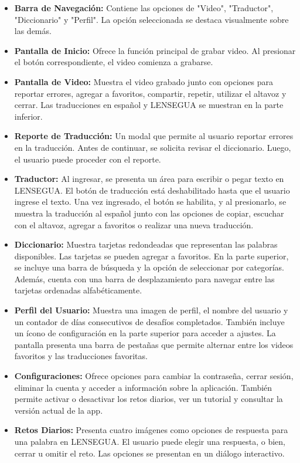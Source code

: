 \begin{itemize}
    \item \textbf{Barra de Navegación:} Contiene las opciones de "Video", "Traductor", "Diccionario" y "Perfil". La opción seleccionada se destaca visualmente sobre las demás.
    
    \item \textbf{Pantalla de Inicio:} Ofrece la función principal de grabar video. Al presionar el botón correspondiente, el video comienza a grabarse.
    
    \item \textbf{Pantalla de Video:} Muestra el video grabado junto con opciones para reportar errores, agregar a favoritos, compartir, repetir, utilizar el altavoz y cerrar. Las traducciones en español y LENSEGUA se muestran en la parte inferior.
    
    \item \textbf{Reporte de Traducción:} Un modal que permite al usuario reportar errores en la traducción. Antes de continuar, se solicita revisar el diccionario. Luego, el usuario puede proceder con el reporte.
    
    \item \textbf{Traductor:} Al ingresar, se presenta un área para escribir o pegar texto en LENSEGUA. El botón de traducción está deshabilitado hasta que el usuario ingrese el texto. Una vez ingresado, el botón se habilita, y al presionarlo, se muestra la traducción al español junto con las opciones de copiar, escuchar con el altavoz, agregar a favoritos o realizar una nueva traducción.
    
    \item \textbf{Diccionario:} Muestra tarjetas redondeadas que representan las palabras disponibles. Las tarjetas se pueden agregar a favoritos. En la parte superior, se incluye una barra de búsqueda y la opción de seleccionar por categorías. Además, cuenta con una barra de desplazamiento para navegar entre las tarjetas ordenadas alfabéticamente.
    
    \item \textbf{Perfil del Usuario:} Muestra una imagen de perfil, el nombre del usuario y un contador de días consecutivos de desafíos completados. También incluye un ícono de configuración en la parte superior para acceder a ajustes. La pantalla presenta una barra de pestañas que permite alternar entre los videos favoritos y las traducciones favoritas.
    
    \item \textbf{Configuraciones:} Ofrece opciones para cambiar la contraseña, cerrar sesión, eliminar la cuenta y acceder a información sobre la aplicación. También permite activar o desactivar los retos diarios, ver un tutorial y consultar la versión actual de la app.
    
    \item \textbf{Retos Diarios:} Presenta cuatro imágenes como opciones de respuesta para una palabra en LENSEGUA. El usuario puede elegir una respuesta, o bien, cerrar u omitir el reto. Las opciones se presentan en un diálogo interactivo.
\end{itemize}

